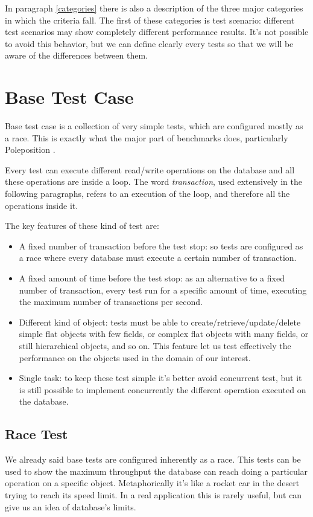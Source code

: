 In paragraph \ref{categories} there is also a description of the three major categories in which the criteria fall. The first of these categories is test scenario: different test scenarios may show completely different performance results. It's not possible to avoid this behavior, but we can define clearly every tests so that we will be aware of the differences between them.

	\section{Base Test Case}
Base test case is a collection of very simple tests, which are configured mostly as a race. This is exactly what the major part of benchmarks does, particularly Poleposition \cite{poleposition}.

Every test can execute different read/write operations on the database and all these operations are inside a loop. The word \emph{transaction}, used extensively in the following paragraphs, refers to an execution of the loop, and therefore all the operations inside it.

The key features of these kind of test are:
\begin{itemize}
	\item A fixed number of transaction before the test stop: so tests are configured as a race where every database must execute a certain number of transaction.
	\item A fixed amount of time before the test stop: as an alternative to a fixed number of transaction, every test run for a specific amount of time, executing the maximum number of transactions per second. 
	\item Different kind of object: tests must be able to create/retrieve/update/delete simple flat objects with few fields, or complex flat objects with many fields, or still hierarchical objects, and so on. This feature let us test effectively the performance on the objects used in the domain of our interest.
	\item Single task: to keep these test simple it's better avoid concurrent test, but it is still possible to implement concurrently the different operation executed on the database.
\end{itemize}
	
		\subsection{Race Test}
We already said base tests are configured inherently as a race. This tests can be used to show the maximum throughput the database can reach doing a particular operation on a specific object. Metaphorically it's like a rocket car in the desert trying to reach its speed limit. In a real application this is rarely useful, but can give us an idea of database's limits. 

